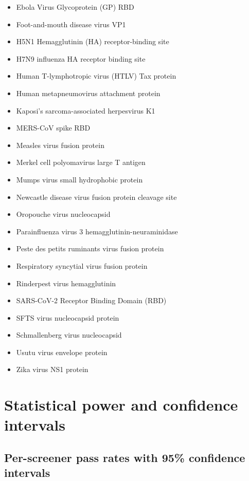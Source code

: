 \documentclass[utf8]{frontiers_suppmat}
\begin{document}
\begin{itemize}
\item Ebola Virus Glycoprotein (GP) RBD
\item Foot-and-mouth disease virus VP1
\item H5N1 Hemagglutinin (HA) receptor-binding site
\item H7N9 influenza HA receptor binding site
\item Human T-lymphotropic virus (HTLV) Tax protein
\item Human metapneumovirus attachment protein
\item Kaposi's sarcoma-associated herpesvirus K1
\item MERS-CoV spike RBD
\item Measles virus fusion protein
\item Merkel cell polyomavirus large T antigen
\item Mumps virus small hydrophobic protein
\item Newcastle disease virus fusion protein cleavage site
\item Oropouche virus nucleocapsid
\item Parainfluenza virus 3 hemagglutinin-neuraminidase
\item Peste des petits ruminants virus fusion protein
\item Respiratory syncytial virus fusion protein
\item Rinderpest virus hemagglutinin
\item SARS-CoV-2 Receptor Binding Domain (RBD)
\item SFTS virus nucleocapsid protein
\item Schmallenberg virus nucleocapsid
\item Usutu virus envelope protein
\item Zika virus NS1 protein
\end{itemize}

\clearpage
\section{Statistical power and confidence intervals}

\subsection{Per-screener pass rates with 95\% confidence intervals}
\end{document}
